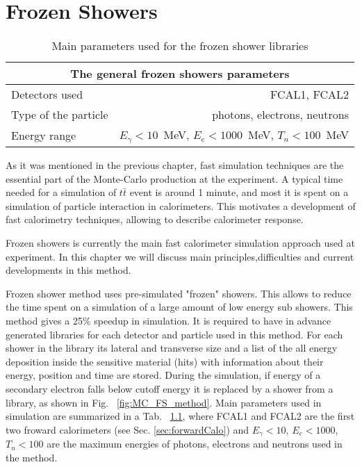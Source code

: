 \chapter{Frozen Showers}\label{chap:FS}
\minitoc

\begin{table}[!b]
\caption{Main parameters used for the frozen shower libraries}
\label{tab:MC_FS_params}
\centering
\begin{tabular}{l|r}
\hline
\hline
\multicolumn{2}{c}{The general frozen showers parameters} \\
\hline
Detectors used            & FCAL1, FCAL2\\
Type of the particle      & photons, electrons, neutrons \\
Energy range              &  $E_{\gamma}<10$~MeV,  $E_{e}<1000$~MeV,  $T_n<100$~MeV \\
\hline
\end{tabular}

\end{table}

As it was mentioned in the previous chapter, fast simulation techniques are the essential part of the Monte-Carlo production at the \atlas experiment. A typical time needed for a simulation of $t\bar{t}$ event is around 1 minute, and most it is spent on a simulation of particle interaction in calorimeters. This motivates a development of fast calorimetry techniques, allowing to describe calorimeter response.

Frozen showers is currently the main fast calorimeter simulation approach used at \atlas experiment. In this chapter we will discuss main principles,difficulties and current developments in this method.

Frozen shower method uses pre-simulated "frozen" showers. This allows to reduce the time spent on a simulation of a large amount of low energy sub showers. This method gives a 25\% speedup in simulation. It is required to have in advance generated libraries for each detector and particle used in this method. For each shower in the library its lateral and transverse size and a list of the all energy deposition inside the sensitive material (hits) with information about their energy, position and time are stored. During the simulation, if energy of a secondary electron falls below cutoff energy it is replaced by a shower from a library, as shown in Fig. ~\ref{fig:MC_FS_method}. Main parameters used in \atlas simulation are summarized in a Tab. ~\ref{tab:MC_FS_params}, where FCAL1 and FCAL2 are the first two froward calorimeters (see Sec. \ref{sec:forwardCalo}) and $E_{\gamma}<10$, $E_{e}<1000$, $T_n<100$ are the maximum energies of photons, electrons and neutrons used in the method. 

